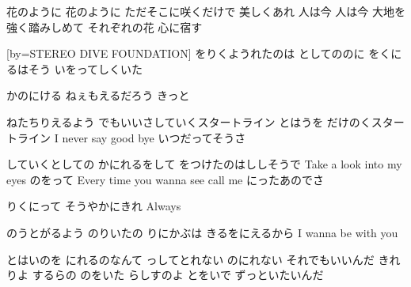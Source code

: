\documentclass{article}
\newenvironment{Japanese}{%
\CJKfamily{min}%
\CJKtilde
\CJKnospace}{}
\begin{document}
\begin{CJK}{UTF8}{}
\begin{Japanese}
\begin{songs}{}
花のように 花のように
ただそこに咲くだけで 美しくあれ
人は今 人は今
大地を強く踏みしめて それぞれの花 心に宿す
\endverse
\endsong

[by=STEREO DIVE FOUNDATION]
\beginverse
{}をりくようれたのは
としてののに
をくにるはそう
いをってしくいた

かのにける
ねぇもえるだろう
きっと

ねたちりえるよう
でもいいさしていくスタートライン
とはうを
だけのくスタートライン
I never say good bye
いつだってそうさ

していくとしての
かにれるをして
をつけたのはししそうで
Take a look into my eyes
のをって
Every time you wanna see call me
にったあのでさ

りくにって
そうやかにきれ
Always

のうとがるよう
のりいたの
りにかぶは
きるをにえるから
I wanna be with you

とはいのを
にれるのなんて
っしてとれない
のにれない
それでもいいんだ
きれりよ
するらの
のをいた
らしすのよ
とをいで
ずっといたいんだ


\end{songs}
\end{Japanese}
\end{CJK}
\end{document}
